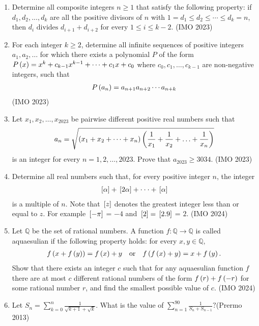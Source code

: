 \begin{enumerate}
\item
Determine all composite integers  $n \geq 1$  that satisfy the following property: if  $d_{1}, d_{2}, ..., d_{k}$  are all the positive divisors of  $n$  with  $1 = d_{1} \le d_{2} \le \cdots \le d_{k} = n$,  then  $d_{i} \text{ divides } d_{i+1} + d_{i+2}$  for every  $1 \leq i \leq k - 2.$ \hfill(IMO 2023)
\item
 For each integer  $k \geq 2$, determine all infinite sequences of positive integers $a_{1}, a_{2}, \ldots$ for which there exists a polynomial  $P$ of the form $ P\left(x\right) = x^{k} + c_{k-1}x^{k-1} + \cdots + c_{1}x + c_{0}$  where $c_{0}, c_{1}, \ldots, c_{k-1}$  are non-negative integers, such that
\begin{align}
	P\left(a_{n}\right) = a_{n+1}a_{n+2}\cdots a_{n+k}
\end{align} \hfill(IMO 2023)
\item
Let $x_{1}, x_{2},\ldots , x_{2023}$  be pairwise different positive real numbers such that 
\begin{align}
a_{n} = \sqrt{\left(x_{1} + x_{2} + \cdots + x_{n}\right) \left(\frac{1}{x_{1}}+\frac{1}{x_{2}}+\ldots+\frac{1}{x_{n}}\right)}
\end{align}
 is an integer for every $n = 1, 2,\ldots, 2023.$  Prove that  $a_{2023} \geq 3034$. \hfill(IMO 2023)
\item
Determine all real numbers such that, for every positive integer $n$, the integer 
\begin{align}
{}\left[\alpha\right] + {}\left[2\alpha\right] + \cdot\cdot\cdot + {}\left[\alpha\right] 
\end{align}
is a multiple of  $n$.  Note that ${}\left[z\right]$  denotes the greatest integer less than or equal to $z$. For example ${}\left[-\pi\right]$ = $-4$  and  ${}\left[2\right] = {}\left[2.9\right]$ = $2$. \hfill(IMO 2024)
\item
 Let  $\mathbb{Q}$  be the set of rational numbers. A function  $f: \mathbb{Q} \to \mathbb{Q}$  is called aquaesulian if the following property holds: for every  $x, y \in \mathbb{Q},$ 
\begin{align}
f\left(x + f\left(y\right)\right) = f\left(x\right) + y \quad \text{or} \quad f\left(f\left(x\right) + y\right) = x + f\left(y\right).
\end{align}
Show that there exists an integer  $c$  such that for any aquaesulian function  $f$  there are at most  $c$  different rational numbers of the form  $f\left(r\right) + f\left(-r\right)$  for some rational number  $r$,  and find the smallest possible value of  $c$. \hfill(IMO 2024)
\item Let
$ S_n = \sum_{k=0}^{n} \frac{1}{\sqrt{k+1} + \sqrt{k}}. $
What is the value of 
$ \sum_{n=1}^{90} \frac{1}{S_n + S_{n-1}}? $\hfill(Prermo 2013)


\end{enumerate}
